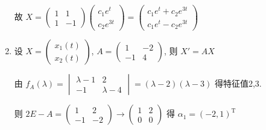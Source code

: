 \begin{enumerate}
                   故 \( X = \begin{pmatrix}
                       1 & 1  \\
                       1 & -1
                   \end{pmatrix}\begin{pmatrix}
                       c_{1}e^{t} \\
                       c_{2}e^{3t}
                   \end{pmatrix} = \begin{pmatrix}
                       c_{1}e^{t} + c_{2}e^{3t} \\
                       c_{1}e^{t} - c_{2}e^{3t}
                   \end{pmatrix} \)
             \item %
                   设 \( X = \begin{pmatrix}
                       x_{1}(t) \\
                       x_{2}(t)
                   \end{pmatrix} \), \( A = \begin{pmatrix}
                       1  & -2 \\
                       -1 & 4
                   \end{pmatrix} \), 则 \( X' = AX \)

                   由 \( f_{A}(\lambda) = \begin{vmatrix}
                       \lambda-1 & 2         \\
                       -1        & \lambda-4
                   \end{vmatrix} = (\lambda-2)(\lambda-3) \) 得特征值2,3.

                   则 \( 2E-A = \begin{pmatrix}
                       1  & 2  \\
                       -1 & -2
                   \end{pmatrix} \rightarrow \begin{pmatrix}
                       1 & 2 \\
                       0 & 0
                   \end{pmatrix} \) 得 \( \alpha_{1} = (-2, 1)^{\mathrm{T}} \)


\end{enumerate}
